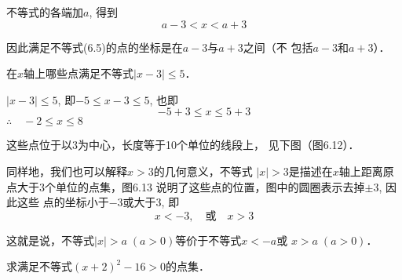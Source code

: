 不等式的各端加$a$, 得到
\begin{equation}
    a-3<x<a+3    
\end{equation}

因此满足不等式(6.5)的点的坐标是在$a-3$与$a+3$之间（不
包括$a-3$和$a+3$）．

\begin{example}
    在$x$轴上哪些点满足不等式$|x-3|\le 5$．
\end{example}

\begin{solution}
    $|x-3|\le 5$, 即$-5\le x-3\le 5$, 也即
$$-5+3\le x\le 5+3$$
$\therefore\quad -2\le x\le 8$

这些点位于以3为中心，长度等于10个单位的线段上，
见下图（图6.12）．
\begin{figure}[htp]
    \centering
{}

    \caption{}
\end{figure}

同样地，我们也可以解释$x>3$的几何意义，不等式
$|x|>3$是描述在$x$轴上距离原点大于3个单位的点集，图6.13
说明了这些点的位置，图中的圆圈表示去掉$\pm 3$, 因此这些
点的坐标小于$-3$或大于3, 即
\[x<-3,\quad \text{或}\quad x>3\]

\begin{figure}[htp]
    \centering
{}

    \caption{}
\end{figure}

这就是说，不等式$|x|>a\; (a>0)$等价于不等式$x<-a$或
$x>a\; (a>0)$．
\end{solution}


\begin{example}
    求满足不等式$(x+2)^2-16>0$的点集．
\end{example}

